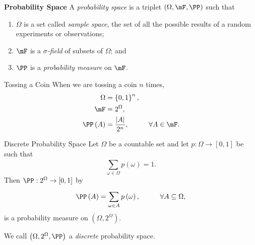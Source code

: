\documentclass[stat901]{subfiles}
\begin{document}
    \begin{definition}{\textbf{Probability Space}}
        A \emph{probability space} is a triplet $\left( \Omega,\mF,\PP \right)$ such that
        \begin{enumerate}
            \item $\Omega$ is a set called \emph{sample space}, the set of all the possible results of a random experiments or observations;
            \item $\mF$ is a \emph{$\sigma$-field} of subsets of $\Omega$; and
            \item $\PP$ is a \emph{probability measure} on $\mF$.
        \end{enumerate}
    \end{definition}

    \begin{example}{Tossing a Coin}
        When we are tossing a coin $n$ times,
        \begin{equation*}
            \begin{aligned}
                \Omega & = \left\lbrace 0,1 \right\rbrace^n, \\
                \mF & = 2^{\Omega}, \\ 
                \PP\left( A \right) & = \frac{\left| A \right|}{2^n}, \hspace{1cm}\forall A\in\mF.
            \end{aligned} 
        \end{equation*}
    \end{example}

    \rruleline

    \begin{example}{Discrete Probability Space}
        Let $\Omega$ be a countable set and let $p:\Omega\to\left[ 0,1 \right]$ be such that
        \begin{equation*}
            \sum^{}_{\omega\in\Omega}p\left( \omega \right) = 1.
        \end{equation*}
        Then $\PP:2^{\Omega}\to\left[ 0,1 \right]$ by
        \begin{equation*}
            \PP\left( A \right) = \sum^{}_{\omega\in A}p\left( \omega \right), \hspace{1cm}\forall A\subseteq\Omega,
        \end{equation*}
        is a probability measure on $\left( \Omega,2^{\Omega} \right)$.

        We call $\left( \Omega,2^{\Omega},\PP \right)$ a \emph{discrete} probability space.
    \end{example}
\end{document}
